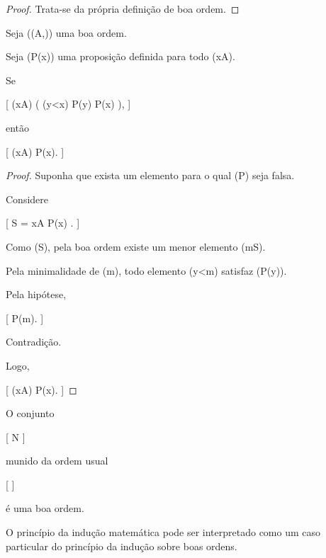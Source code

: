 \documentclass[../../main]{subfiles}
\begin{document}
\begin{proof}

	Trata-se da própria definição de boa ordem.

\end{proof}

\begin{prop}
	\label{prop:matematica:relacoes:inducao-boa-ordem}

	Seja ((A,\le)) uma boa ordem.

	Seja (P(x)) uma proposição definida para todo (x\in A).

	Se

		[
			(\forall x\in A)
			\Bigl(
			(\forall y<x)
			P(y)
			\Rightarrow
			P(x)
			\Bigr),
		]

	então

	[
	(\forall x\in A)
	P(x).
	]

\end{prop}

\begin{proof}

	Suponha que exista um elemento para o qual (P) seja falsa.

	Considere

		[
			S
				=
				{
					x\in A
					\mid
					\neg P(x)
				}.
		]

	Como (S\neq\varnothing), pela boa ordem existe um menor elemento
	(m\in S).

	Pela minimalidade de (m), todo elemento (y<m) satisfaz (P(y)).

	Pela hipótese,

	[
			P(m).
		]

	Contradição.

	Logo,

	[
			(\forall x\in A)
			P(x).
		]

\end{proof}

\begin{ex}

	O conjunto

		[
			\mathbb N
		]

	munido da ordem usual

		[
			\le
		]

	é uma boa ordem.

\end{ex}

\begin{obs}

	O princípio da indução matemática pode ser interpretado como um caso
	particular do princípio da indução sobre boas ordens.

\end{obs}
\end{document}
